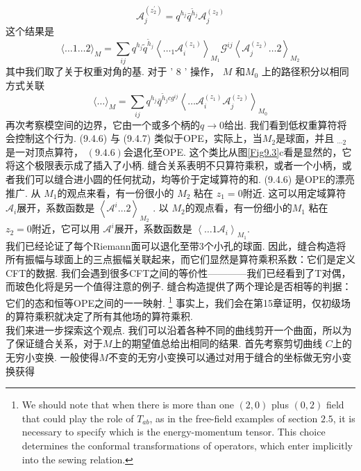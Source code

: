 \begin{equation}
	\mathscr{A}_{j}^{\left(z_{2}^{\prime}\right)}=q^{h_{j}} \bar{q}^{\tilde{h}_{j}} \mathscr{A}_{j}^{\left(z_{2}\right)}
\end{equation}
这个结果是
\begin{equation}
	\langle\ldots 1 \ldots 2\rangle_{M}=\sum_{i j} q^{h_{j}} \tilde{q}^{\tilde{h}_{j}}\left\langle\ldots_{1} \mathscr{A}_{i}^{\left(z_{1}\right)}\right\rangle_{M_{1}} \mathscr{G}^{i j}\left\langle\mathscr{A}_{j}^{\left(z_{2}\right)} \ldots 2\right\rangle_{M_{2}}
\end{equation}
其中我们取了关于权重对角的基. 对于 ' 8 ' 操作， $M$ 和$M_{0}$ 上的路径积分以相同方式关联
\begin{equation}
	\langle\ldots\rangle_{M}=\sum_{i j} q^{h_{j}} \bar{q}^{\tilde{h}_{j} c g^{i j}}\left\langle\ldots \mathscr{A}_{i}^{\left(z_{1}\right)} \mathscr{A}_{j}^{\left(z_{2}\right)}\right\rangle_{M_{0}}
\end{equation}
再次考察模空间的边界，它由一个或多个柄的$q \rightarrow 0$给出. 我们看到低权重算符将会控制这个行为.  (9.4.6) 与 (9.4.7) 类似于OPE，实际上，当$M_{2}$是球面，并且 ${}_{\cdots 2}$是一对顶点算符，  $(9.4 .6)$会退化至OPE. 这个类比从图\ref{Fig9.3}c看是显然的，它将这个极限表示成了插入了小柄. 缝合关系表明不只算符乘积，或者一个小柄，或者我们可以缝合进小圆的任何扰动，均等价于定域算符的和. 
(9.4.6) 是OPE的漂亮推广. 从 $M_{1}$的观点来看，有一份很小的 $M_{2}$ 粘在 $z_{1}=0$附近. 这可以用定域算符 $\mathscr{A}_{i}$展开，系数函数是 $\left\langle\mathscr{A}^{i} \ldots 2\right\rangle_{M_{2}}$ . 以 $M_{2}$的观点看，有一份细小的$M_{1}$ 粘在 $z_{2}=0$附近，它可以用 $\mathscr{A}^{i}$展开，系数函数是 $\left\langle\ldots 1 \mathscr{A}_{i}\right\rangle_{M_{1}}$.\\
我们已经论证了每个Riemann面可以退化至带3个小孔的球面. 因此，缝合构造将所有振幅与球面上的三点振幅关联起来，而它们显然是算符乘积系数：它们是定义CFT的数据. 我们会遇到很多CFT之间的等价性————我们已经看到了T对偶，而玻色化将是另一个值得注意的例子. 缝合构造提供了两个理论是否相等的判据：它们的态和恒等OPE之间的一一映射. 
\footnote{ We should note that when there is more than one $(2,0)$ plus $(0,2)$ field that could play the role of $T_{a b}$, as in the free-field examples of section $2.5$, it is necessary to specify which is the energy-momentum tensor. This choice determines the conformal transformations of operators, which enter implicitly into the sewing relation.}
事实上，我们会在第15章证明，仅初级场的算符乘积就决定了所有其他场的算符乘积. \\
我们来进一步探索这个观点. 我们可以沿着各种不同的曲线剪开一个曲面，所以为了保证缝合关系，对于$M$上的期望值总给出相同的结果. 首先考察剪切曲线 $C$上的无穷小变换. 一般使得$M$不变的无穷小变换可以通过对用于缝合的坐标做无穷小变换获得
